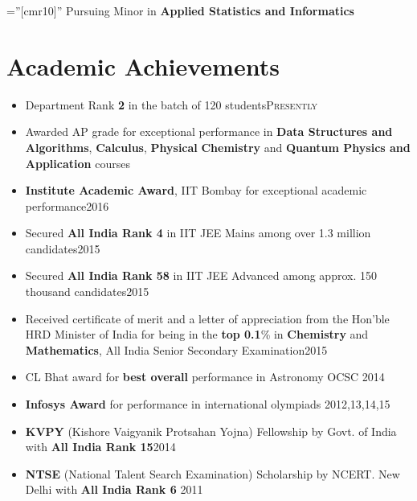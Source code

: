 \documentclass[a4paper,10pt]{article}
\begin{document}
\pagestyle{empty}
\font\fb=''[cmr10]'' %
\vspace*{45mm}
Pursuing Minor in \textbf{Applied Statistics and Informatics}
\vspace{-8pt}
\section{Academic Achievements}
 \begin{itemize}
     \item Department Rank \textbf{2} in the batch of 120 students\hfill\textsc{Presently}
     \item Awarded AP grade for exceptional performance in \textbf{Data Structures and Algorithms}, \textbf{Calculus}, \textbf{Physical} \textbf{Chemistry} and \textbf{Quantum Physics and Application} courses
     \item \textbf{Institute Academic Award}, IIT Bombay for exceptional academic performance\hfill 2016
     \item Secured \textbf{All India Rank 4} in IIT JEE Mains among over 1.3 million candidates\hfill2015
     \item Secured \textbf{All India Rank 58} in IIT JEE Advanced among approx. 150 thousand candidates\hfill2015
     \item Received certificate of merit and a letter of appreciation from the Hon'ble HRD Minister of India for being in the \textbf{top 0.1}\% in \textbf{Chemistry} and \textbf{Mathematics}, All India Senior Secondary Examination\hfill 2015
     \item CL Bhat award for \textbf{best overall} performance in Astronomy OCSC \hfill 2014
     \item \textbf{Infosys Award} for performance in international olympiads \hfill 2012,13,14,15
     \item  \textbf{KVPY} (Kishore Vaigyanik Protsahan Yojna) Fellowship by Govt. of India with \textbf{All India Rank 15}\hfill 2014
     \item  \textbf{NTSE} (National Talent Search Examination) Scholarship by NCERT. New Delhi with \textbf{All India Rank 6} \hfill 2011

\end{itemize}
\end{document}
